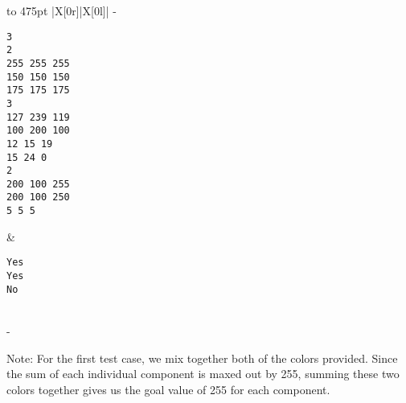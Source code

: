 \documentclass[a4paper,11pt]{article}
\begin{document}
\begin{tabu*} to 475pt {|X[0r]|X[0l]|}
\tabucline-
\vspace{-\baselineskip} %
\begin{Verbatim}
3
2
255 255 255
150 150 150
175 175 175
3
127 239 119
100 200 100
12 15 19
15 24 0
2
200 100 255
200 100 250
5 5 5
\end{Verbatim}
&
\vspace{-\baselineskip} %
\begin{Verbatim}
Yes
Yes
No
\end{Verbatim}
\\
\tabucline-
\end{tabu*}
\vspace{10mm}
{
Note: For the first test case, we mix together both of the colors provided. Since the sum of each individual component is maxed out by 255, summing these two colors together gives us the goal value of 255 for each component.
}
\end{document}
